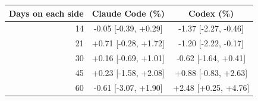 \begin{tabular}{rcc}
\toprule
Days on each side & Claude Code (\%) & Codex (\%) \\
\midrule
14 & -0.05 [-0.39, +0.29] & -1.37 [-2.27, -0.46] \\
21 & +0.71 [-0.28, +1.72] & -1.20 [-2.22, -0.17] \\
30 & +0.16 [-0.69, +1.01] & -0.62 [-1.64, +0.41] \\
45 & +0.23 [-1.58, +2.08] & +0.88 [-0.83, +2.63] \\
60 & -0.61 [-3.07, +1.90] & +2.48 [+0.25, +4.76] \\
\bottomrule
\end{tabular}
